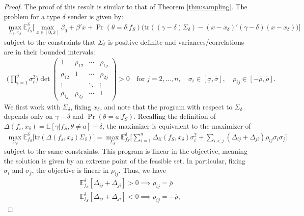 \documentclass[11pt,dvipsnames]{article}
\newcommand{\xlow}{0}
\newcommand{\trace}{\mathrm{tr}}
\begin{document}
\begin{appendix}
\samplingmulti*
\begin{proof}
The proof of this result is similar to that of Theorem \ref{thm:sampling}.
The problem for a type $\delta$ sender is given by:
\begin{align*}
\max_{\Sigma_\delta,x_\delta}
\mathbb{E}_{f_S}^\delta	
\bigg[
\max_{x \in [\xlow,\overline{x}]}
\beta_0+\beta'x +
\Pr(\theta=\delta|f_S)
\bigg(\trace{((\gamma-\delta)\Sigma_\delta)} 
- (x-x_\delta)'(\gamma-\delta)(x-x_\delta)\bigg)\bigg]
\end{align*}
subject to the constraints that $\Sigma_\delta$ is positive definite and variances/correlations are in their bounded intervals:
\begin{align*}
\Big(\prod_{i=1}^j \sigma_i^2\Big)\det\begin{pmatrix}
1 & \rho_{12} & \cdots & \rho_{1j}\\
\rho_{12} & 1 & \cdots & \rho_{2j}\\
\vdots & & \ddots & \vdots\\
\rho_{1j} & \rho_{2j} & \cdots & 1
\end{pmatrix} > 0 \quad \text{for } j = 2,\ldots,n, \quad
\sigma_i \in [\underline{\sigma},\overline{\sigma}],\quad
\rho_{ij} \in [-\overline{\rho},\overline{\rho}].
\end{align*}
We first work with $\Sigma_\delta$, fixing $x_\delta$, and note that the program with respect to $\Sigma_\delta$ depends only on $\gamma-\delta$ and $\Pr(\theta=a|f_S)$.
Recalling the definition of $\Delta(f_s,x_\delta) = \mathbb{E}[\gamma|f_S,\theta \neq a]-\delta$, the maximizer is equivalent to the maximizer of
\begin{align*}
\max_{\Sigma_\delta}
\mathbb{E}_{f_S}^\delta	
\big[
\trace{(\Delta(f_s,x_\delta)\Sigma_\delta)}
\big]	
=
\max_{\Sigma_\delta}
\mathbb{E}_{f_S}^\delta	
\big[
\sum_{i=1}^n \Delta_{ii}(f_S,x_\delta)\sigma_i^2
+ \sum_{i<j}
(\Delta_{ij}+\Delta_{ji})\rho_{ij}\sigma_i\sigma_j
\big]	
\end{align*}
subject to the same constraints.
This program is linear in the objective, meaning the solution is given by an extreme point of the feasible set.
In particular, fixing $\sigma_i$ and $\sigma_j$, the objective is linear in $\rho_{ij}$.
Thus, we have
\begin{align*}
&\mathbb{E}_{f_S}^\delta[\Delta_{ij}+\Delta_{ji}]>0 \implies \rho_{ij} = \overline{\rho}
\\
&\mathbb{E}_{f_S}^\delta[\Delta_{ij}+\Delta_{ji}]<0 \implies \rho_{ij} = -\overline{\rho},		
\end{align*}

\end{proof}
\end{appendix}
\end{document}
